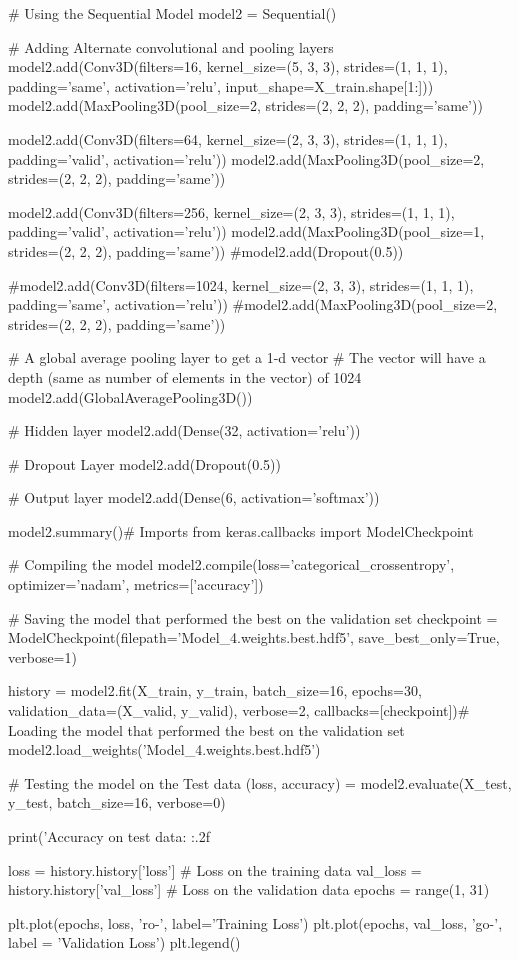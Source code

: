 \documentclass[11pt]{article}
\begin{document}
# Using the Sequential Model
model2 = Sequential()

# Adding Alternate convolutional and pooling layers
model2.add(Conv3D(filters=16, kernel_size=(5, 3, 3), strides=(1, 1, 1), padding='same', activation='relu', 
                 input_shape=X_train.shape[1:]))
model2.add(MaxPooling3D(pool_size=2, strides=(2, 2, 2), padding='same'))


model2.add(Conv3D(filters=64, kernel_size=(2, 3, 3), strides=(1, 1, 1), padding='valid', activation='relu'))
model2.add(MaxPooling3D(pool_size=2, strides=(2, 2, 2), padding='same'))


model2.add(Conv3D(filters=256, kernel_size=(2, 3, 3), strides=(1, 1, 1), padding='valid', activation='relu'))
model2.add(MaxPooling3D(pool_size=1, strides=(2, 2, 2), padding='same'))
#model2.add(Dropout(0.5))

#model2.add(Conv3D(filters=1024, kernel_size=(2, 3, 3), strides=(1, 1, 1), padding='same', activation='relu'))
#model2.add(MaxPooling3D(pool_size=2, strides=(2, 2, 2), padding='same'))

# A global average pooling layer to get a 1-d vector
# The vector will have a depth (same as number of elements in the vector) of 1024
model2.add(GlobalAveragePooling3D())

# Hidden layer
model2.add(Dense(32, activation='relu'))

# Dropout Layer
model2.add(Dropout(0.5))

# Output layer
model2.add(Dense(6, activation='softmax'))

model2.summary()# Imports
from keras.callbacks import ModelCheckpoint

# Compiling the model
model2.compile(loss='categorical_crossentropy', optimizer='nadam', metrics=['accuracy'])

# Saving the model that performed the best on the validation set
checkpoint = ModelCheckpoint(filepath='Model_4.weights.best.hdf5', save_best_only=True, verbose=1)


history = model2.fit(X_train, y_train, batch_size=16, epochs=30, 
                    validation_data=(X_valid, y_valid), verbose=2, callbacks=[checkpoint])# Loading the model that performed the best on the validation set
model2.load_weights('Model_4.weights.best.hdf5')

# Testing the model on the Test data
(loss, accuracy) = model2.evaluate(X_test, y_test, batch_size=16, verbose=0)

print('Accuracy on test data: {:.2f}%

loss = history.history['loss']                          # Loss on the training data
val_loss = history.history['val_loss']                  # Loss on the validation data
epochs = range(1, 31)

plt.plot(epochs, loss, 'ro-', label='Training Loss')
plt.plot(epochs, val_loss, 'go-', label = 'Validation Loss')
plt.legend()

    
    
    
    
\end{document}
